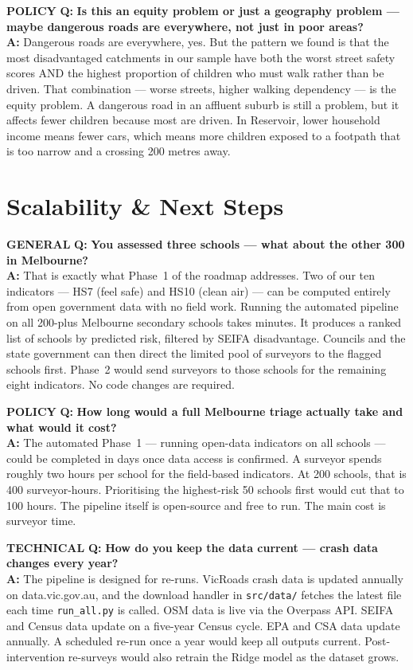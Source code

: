 \documentclass[10pt,a4paper]{extarticle}
\newcommand{\qa}[4]{%
  \begin{mdframed}[
    backgroundcolor=PG,
    linecolor=MG,
    linewidth=1.2pt,
    leftline=true, rightline=false, topline=false, bottomline=false,
    innerleftmargin=10pt, innerrightmargin=8pt,
    innertopmargin=6pt, innerbottommargin=7pt,
    skipabove=5pt, skipbelow=2pt
  ]
  \noindent
  \colorbox{#2}{\tiny\color{white}\textbf{#1}}\hspace{4pt}%
  {\bfseries\color{DG} Q:} {\bfseries\color{INK}#3}\\[3pt]
  {\bfseries\color{MG} A:} {\color{SLT}#4}
  \end{mdframed}%
}
\begin{document}
\qa{POLICY}{AMB}
{Is this an equity problem or just a geography problem --- maybe dangerous roads are everywhere, not just in poor areas?}
{Dangerous roads are everywhere, yes. But the pattern we found is that the most disadvantaged catchments in our sample have both the worst street safety scores AND the highest proportion of children who must walk rather than be driven. That combination --- worse streets, higher walking dependency --- is the equity problem. A dangerous road in an affluent suburb is still a problem, but it affects fewer children because most are driven. In Reservoir, lower household income means fewer cars, which means more children exposed to a footpath that is too narrow and a crossing 200 metres away.}

\section{Scalability \& Next Steps}

\qa{GENERAL}{TEA}
{You assessed three schools --- what about the other 300 in Melbourne?}
{That is exactly what Phase~1 of the roadmap addresses. Two of our ten indicators --- HS7 (feel safe) and HS10 (clean air) --- can be computed entirely from open government data with no field work. Running the automated pipeline on all 200-plus Melbourne secondary schools takes minutes. It produces a ranked list of schools by predicted risk, filtered by SEIFA disadvantage. Councils and the state government can then direct the limited pool of surveyors to the flagged schools first. Phase~2 would send surveyors to those schools for the remaining eight indicators. No code changes are required.}

\qa{POLICY}{AMB}
{How long would a full Melbourne triage actually take and what would it cost?}
{The automated Phase~1 --- running open-data indicators on all schools --- could be completed in days once data access is confirmed. A surveyor spends roughly two hours per school for the field-based indicators. At 200 schools, that is 400 surveyor-hours. Prioritising the highest-risk 50 schools first would cut that to 100 hours. The pipeline itself is open-source and free to run. The main cost is surveyor time.}

\qa{TECHNICAL}{MG}
{How do you keep the data current --- crash data changes every year?}
{The pipeline is designed for re-runs. VicRoads crash data is updated annually on data.vic.gov.au, and the download handler in \texttt{src/data/} fetches the latest file each time \texttt{run\_all.py} is called. OSM data is live via the Overpass API. SEIFA and Census data update on a five-year Census cycle. EPA and CSA data update annually. A scheduled re-run once a year would keep all outputs current. Post-intervention re-surveys would also retrain the Ridge model as the dataset grows.}
\end{document}
